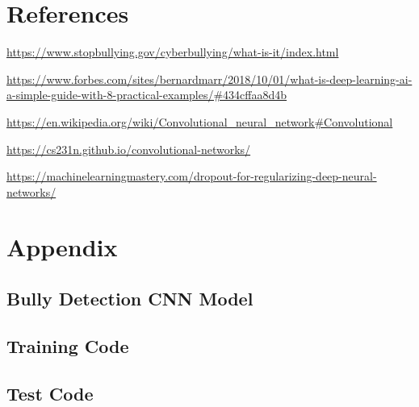 \documentclass[12pt]{article}
\begin{document}
\section{References}
\begin{enumerate}[label={[\arabic*]}]
\item \url{https://www.stopbullying.gov/cyberbullying/what-is-it/index.html}
\item \url{https://www.forbes.com/sites/bernardmarr/2018/10/01/what-is-deep-learning-ai-a-simple-guide-with-8-practical-examples/#434cffaa8d4b}
\item \url{https://en.wikipedia.org/wiki/Convolutional_neural_network#Convolutional}
\item \url{https://cs231n.github.io/convolutional-networks/}
\item \url{https://machinelearningmastery.com/dropout-for-regularizing-deep-neural-networks/}
\end{enumerate}
\newpage

\section{Appendix}
\subsection{Bully Detection CNN Model}

\subsection{Training Code}

\subsection{Test Code}

\end{document}
